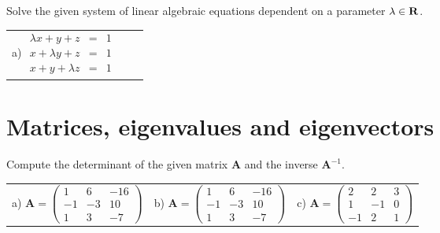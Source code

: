 \documentclass[a4paper,10pt]{book}
\def\Real{{\rm\bf R}}
\begin{document}
\exercise \label{ex:slr2} Solve the given system of linear algebraic equations dependent on a parameter $\lambda\in\Real$.
\begin{center}
\begin{tabular}{ccc}
a)  $\begin{array}{rcl}
    \lambda x + y + z & = & 1 \\
    x + \lambda y + z & = & 1 \\
    x + y + \lambda z & = & 1 
  \end{array} $ %
\end{tabular}
\end{center}

\section{Matrices, eigenvalues and eigenvectors}
\exercise \label{ex:mvlc1} Compute the determinant of the given matrix $\mathbf{A}$ and the inverse $\mathbf{A}^{-1}$.

\begin{center}
\begin{tabular}{ccc}
a)  $ \mathbf{A}=
          \begin{pmatrix}
            1 & 6 & -16 \\
            -1 & -3 & 10 \\
            1 & 3 & -7
          \end{pmatrix}
  $ &
b)  $ \mathbf{A}=
          \begin{pmatrix}
            1 & 6 & -16 \\
            -1 & -3 & 10 \\
            1 & 3 & -7
          \end{pmatrix}
  $ &  
c)  $ \mathbf{A}=
          \begin{pmatrix}
            2 & 2 & 3 \\
            1 & -1 & 0 \\
            -1 & 2 & 1
          \end{pmatrix}
  $
\end{tabular}
\end{center}
\end{document}
